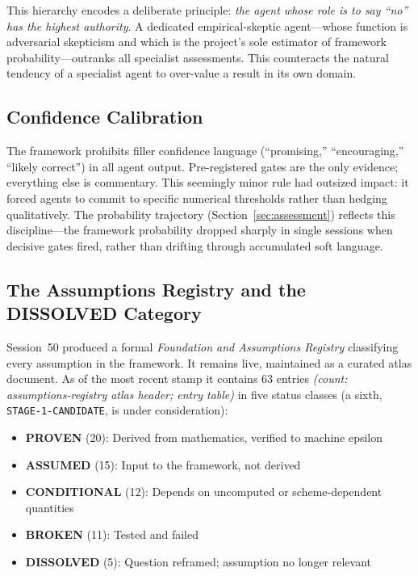 \documentclass[12pt,a4paper]{article}
\newcommand{\countnote}[1]{{\small\textit{(count: #1)}}}
\begin{document}
This hierarchy encodes a deliberate principle: \emph{the agent whose role is to say ``no'' has the highest authority}. A dedicated empirical-skeptic agent---whose function is adversarial skepticism and which is the project's sole estimator of framework probability---outranks all specialist assessments. This counteracts the natural tendency of a specialist agent to over-value a result in its own domain.

\subsection{Confidence Calibration}

The framework prohibits filler confidence language (``promising,'' ``encouraging,'' ``likely correct'') in all agent output. Pre-registered gates are the only evidence; everything else is commentary. This seemingly minor rule had outsized impact: it forced agents to commit to specific numerical thresholds rather than hedging qualitatively. The probability trajectory (Section~\ref{sec:assessment}) reflects this discipline---the framework probability dropped sharply in single sessions when decisive gates fired, rather than drifting through accumulated soft language.

\subsection{The Assumptions Registry and the DISSOLVED Category}
\label{sec:dissolved}

Session~50 produced a formal \emph{Foundation and Assumptions Registry} classifying every assumption in the framework. It remains live, maintained as a curated atlas document. As of the most recent stamp it contains 63 entries \countnote{assumptions-registry atlas header; entry table} in five status classes (a sixth, \texttt{STAGE-1-CANDIDATE}, is under consideration):

\begin{itemize}
    \item \textcolor{proven}{\textbf{PROVEN}} (20): Derived from mathematics, verified to machine epsilon
    \item \textcolor{assumed}{\textbf{ASSUMED}} (15): Input to the framework, not derived
    \item \textcolor{conditional}{\textbf{CONDITIONAL}} (12): Depends on uncomputed or scheme-dependent quantities
    \item \textcolor{broken}{\textbf{BROKEN}} (11): Tested and failed
    \item \textcolor{dissolved}{\textbf{DISSOLVED}} (5): Question reframed; assumption no longer relevant
\end{itemize}
\end{document}
